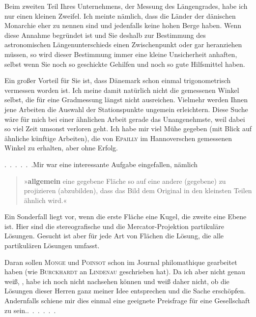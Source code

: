 \par\noindent\hspace*{\parindent}Beim zweiten Teil Ihres Unternehmens, der Messung des Längengrades, habe ich nur einen kleinen Zweifel. Ich meinte nämlich, dass die Länder der dänischen Monarchie eher  zu nennen sind und jedenfalls keine hohen Berge haben. Wenn diese Annahme begründet ist und Sie deshalb zur Bestimmung des astronomischen Längenunterschieds einen Zwischenpunkt oder gar  heranziehen müssen, so wird dieser Bestimmung immer eine kleine Unsicherheit anhaften, selbst wenn Sie noch so geschickte Gehilfen und noch so gute Hilfsmittel haben.

\par\noindent\hspace*{\parindent}Ein großer Vorteil für Sie ist, dass Dänemark schon einmal trigonometrisch vermessen worden ist. Ich meine damit natürlich nicht die gemessenen Winkel selbst, die für eine Gradmessung längst nicht ausreichen. Vielmehr werden Ihnen jene Arbeiten die Auswahl der Stationspunkte ungemein erleichtern. Diese Suche wäre für mich bei einer ähnlichen Arbeit gerade das Unangenehmste, weil dabei so viel Zeit umsonst verloren geht. Ich habe mir viel Mühe gegeben (mit Blick auf ähnliche künftige Arbeiten), die von \textsc{Epailly} im Hannoverschen gemessenen Winkel zu erhalten, aber ohne Erfolg.

\par\noindent\hspace*{\parindent}.\ .\ .\ .\ .\ .\quad Mir war eine interessante Aufgabe eingefallen, nämlich
\begin{quote}
\noindent»\textbf{allgemein} eine gegebene Fläche so auf eine andere (gegebene) zu projizieren (abzubilden), dass das Bild dem Original in den kleinsten Teilen ähnlich wird.«
\end{quote}
\par\noindent\hspace*{\parindent}Ein Sonderfall liegt vor, wenn die erste Fläche eine Kugel, die zweite eine Ebene ist. Hier sind die stereografische und die Mercator-Projektion partikuläre Lösungen. Gesucht ist aber für jede Art von Flächen die  Lösung, die alle partikulären Lösungen umfasst.

\par\noindent\hspace*{\parindent}Daran sollen \textsc{Monge} und \textsc{Poinsot} schon im Journal philomathique gearbeitet haben (wie \textsc{Burckhardt} an \textsc{Lindenau} geschrieben hat). Da ich aber nicht genau weiß, , habe ich noch nicht nachsehen können und weiß daher nicht, ob die Lösungen dieser Herren ganz meiner Idee entsprechen und die Sache erschöpfen. Andernfalls schiene mir dies einmal eine geeignete Preisfrage für eine Gesellschaft zu sein.\quad.\ .\ .\ .\ .\ .
